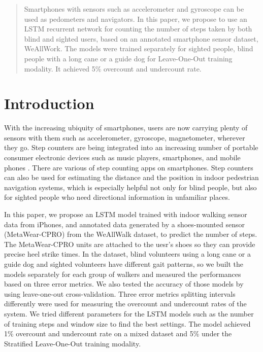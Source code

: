 \documentclass[11pt]{article}
\begin{document}
{\begin{abstract}
Smartphones with sensors such as accelerometer and gyroscope can be used as pedometers and navigators. In this paper, we propose to use an LSTM recurrent network for counting the number of steps taken by both blind and sighted users, based on an annotated smartphone sensor dataset, WeAllWork. The models were trained separately for sighted people, blind people with a long cane or a guide dog for Leave-One-Out training modality. It achieved 5\% overcount and undercount rate.

\end{abstract}

\section{Introduction}

With the increasing ubiquity of smartphones, users are now carrying plenty of sensors with them such as accelerometer, gyroscope, magnetometer, wherever they go. Step counters are being integrated into an increasing number of portable consumer electronic devices such as music players, smartphones, and mobile phones \cite{wiki:pedometer}. There are various of step counting apps on smartphones. Step counters can also be used for estimating the distance and the position in indoor pedestrian navigation systems, which is especially helpful not only for blind people, but also for sighted people who need directional information in unfamiliar places.

In this paper, we propose an LSTM model trained with indoor walking sensor data from iPhones, and annotated data generated by a shoes-mounted sensor (MetaWear-CPRO) from the WeAllWalk dataset, to predict the number of steps. The MetaWear-CPRO units are attached to the uesr's shoes so they can provide precise heel strike times. In the dataset, blind volunteers using a long cane or a guide dog and sighted volunteers have different gait patterns, so we built the models separately for each group of walkers and measured the performances based on three error metrics. We also tested the accuracy of those models by using leave-one-out cross-validation. Three error metrics splitting intervals differently were used for measuring the overcount and undercount rates of the system. We tried different parameters for the LSTM models such as the number of training steps and window size to find the best settings. The model achieved 1\% overcount and undercount rate on a mixed dataset and 5\% under the Stratified Leave-One-Out training modality.



}
\end{document}
